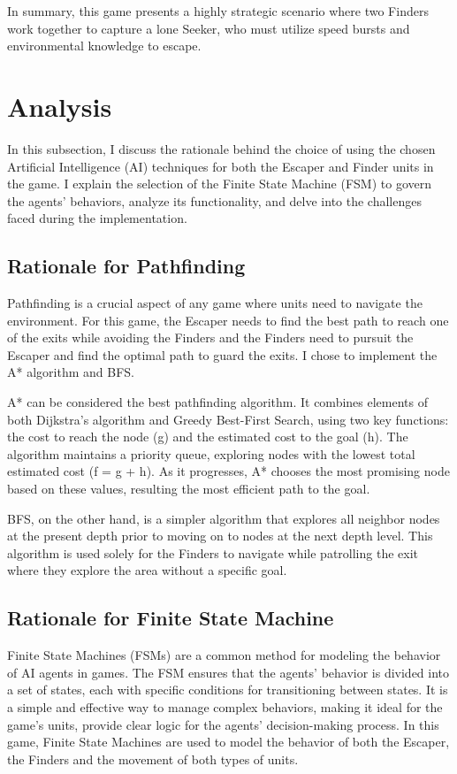 \documentclass[a4paper,12pt]{article}
\begin{document}
In summary, this game presents a highly strategic scenario where two Finders work together to capture a lone Seeker, who must utilize speed bursts and environmental knowledge to escape.



\section{Analysis}
In this subsection, I discuss the rationale behind the choice of using the chosen Artificial Intelligence (AI) techniques for both the Escaper and Finder units in the game.
I explain the selection of the Finite State Machine (FSM) to govern the agents' behaviors, analyze its functionality, and delve into the challenges faced during the implementation.


\subsection{Rationale for Pathfinding}
Pathfinding is a crucial aspect of any game where units need to navigate the environment.
For this game, the Escaper needs to find the best path to reach one of the exits while avoiding the Finders and the Finders need to pursuit the Escaper and find the optimal path to guard the exits.
I chose to implement the A* algorithm and BFS.

A* can be considered the best pathfinding algorithm.
It combines elements of both Dijkstra's algorithm and Greedy Best-First Search, using two key functions: the cost to reach the node (g) and the estimated cost to the goal (h). 
The algorithm maintains a priority queue, exploring nodes with the lowest total estimated cost (f = g + h). 
As it progresses, A* chooses the most promising node based on these values, resulting the most efficient path to the goal.

BFS, on the other hand, is a simpler algorithm that explores all neighbor nodes at the present depth prior to moving on to nodes at the next depth level.
This algorithm is used solely for the Finders to navigate while patrolling the exit where they explore the area without a specific goal.


\subsection{Rationale for Finite State Machine}
Finite State Machines (FSMs) are a common method for modeling the behavior of AI agents in games.
The FSM ensures that the agents' behavior is divided into a set of states, each with specific conditions for transitioning between states.
It is a simple and effective way to manage complex behaviors, making it ideal for the game's units, provide clear logic for the agents' decision-making process.
In this game, Finite State Machines are used to model the behavior of both the Escaper, the Finders and the movement of both types of units.
\end{document}
